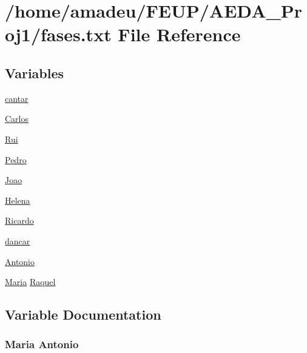 \hypertarget{fases_8txt}{}\section{/home/amadeu/\+F\+E\+U\+P/\+A\+E\+D\+A\+\_\+\+Proj1/fases.txt File Reference}
\label{fases_8txt}
\subsection*{Variables}
\begin{DoxyCompactItemize}
\item 
\hyperlink{fases_8txt_a2616159a76d0e8a5493734758ae9c160}{cantar}
\item 
\hyperlink{fases_8txt_a8c64f18bebe8b957cbc75ce757dd3af4}{Carlos}
\item 
\hyperlink{fases_8txt_ae102a7586632535be9ea3d3f64768ab4}{Rui}
\item 
\hyperlink{fases_8txt_a83ec618410e4714b08aa56507a10f025}{Pedro}
\item 
\hyperlink{fases_8txt_a07ad80fe6680f2ac3523954e065ee97d}{Joao}
\item 
\hyperlink{fases_8txt_abc15862bdb1800c6fcdf948e0de62523}{Helena}
\item 
\hyperlink{fases_8txt_a508a855615268f4003a2dcef768b5abe}{Ricardo}
\item 
\hyperlink{fases_8txt_a7a54d64ce86da7c9cb1cec1f9b572e14}{dancar}
\item 
\hyperlink{fases_8txt_ad48e47e2e0f1add17c5dcd5c9dfc1381}{Antonio}
\item 
\hyperlink{sessoes_8txt_a0375353ca858a7b935ff53ef0a3c9a98}{Maria} \hyperlink{fases_8txt_a0fa004e8ae93e7afad527aaa2bb04dff}{Raquel}
\end{DoxyCompactItemize}


\subsection{Variable Documentation}
\subsubsection[{\texorpdfstring{Antonio}{Antonio}}]{ {\bf Maria} Antonio}\hypertarget{fases_8txt_ad48e47e2e0f1add17c5dcd5c9dfc1381}{}\label{fases_8txt_ad48e47e2e0f1add17c5dcd5c9dfc1381}
